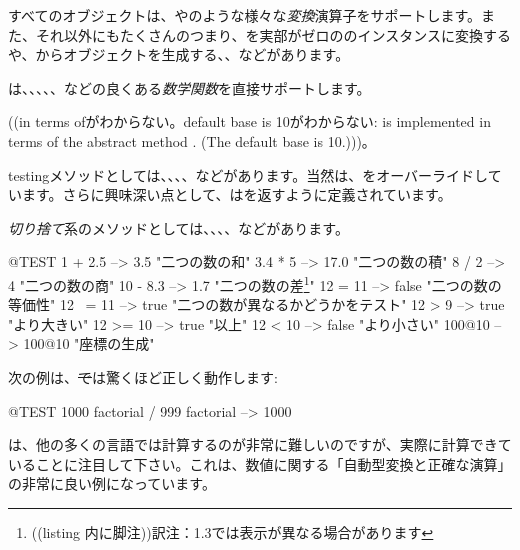 \documentclass[a4paper,10pt,twoside]{book}
\begin{document}
すべてのオブジェクトは、やのような様々な\emph{変換}演算子をサポートします。また、それ以外にもたくさんのつまり、を実部がゼロののインスタンスに変換するや、からオブジェクトを生成する、、などがあります。

は、、、、、などの良くある\emph{数学関数}を直接サポートします。

((in terms ofがわからない。default base is 10がわからない:  is implemented in terms of the abstract method . (The default base is 10.)))。

testingメソッドとしては、、、、などがあります。当然は、をオーバーライドしています。さらに興味深い点として、はを返すように定義されています。

\emph{切り捨て}系のメソッドとしては、、、、などがあります。

\begin{code}{@TEST}
1 + 2.5     --> 3.5             "二つの数の和"
3.4 * 5      --> 17.0           "二つの数の積"
8 / 2         --> 4                 "二つの数の商"
10 - 8.3   --> 1.7              "二つの数の差\footnote{((listing 内に脚注))訳注：\pharo 1.3では表示が異なる場合があります}"
12 = 11    --> false           "二つの数の等価性"
12 ~= 11 --> true            "二つの数が異なるかどうかをテスト"
12 > 9      --> true            "より大きい"
12 >= 10  --> true            "以上"
12 < 10    --> false           "より小さい"
100@10   --> 100@10    "座標の生成"
\end{code}

次の例は、\st では驚くほど正しく動作します:
\begin{code}{@TEST}
1000 factorial / 999 factorial --> 1000
\end{code}
は、他の多くの言語では計算するのが非常に難しいのですが、実際に計算できていることに注目して下さい。これは、数値に関する「自動型変換と正確な演算」の非常に良い例になっています。
\end{document}
